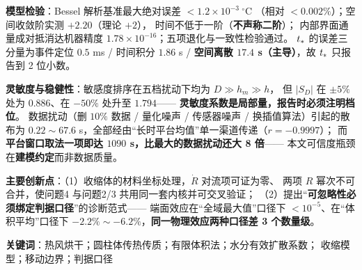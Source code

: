 \textbf{模型检验}：Bessel 解析基准最大绝对误差 $<1.2\times10^{-3}\ ^\circ\mathrm{C}$
（相对 $<0.002\%$）；空间收敛阶实测 $+2.20$（理论 $+2$），
时间不低于一阶（\textbf{不声称二阶}）；
内部界面通量成对抵消达机器精度 $1.78\times10^{-16}$；五项退化与一致性检验通过。
$t_{*}$ 的误差三分量为事件定位 $0.5$ ms / 时间积分 $1.86$ s /
\textbf{空间离散 $17.4$ s（主导）}，故 $t_{*}$ 只报告到 2 位小数。

\textbf{灵敏度与稳健性}：敏感度排序在五档扰动下均为 $D\gg h_m\gg h$，
但 $|S_D|$ 在 $\pm5\%$ 处为 $0.886$、在 $-50\%$ 处升至 $1.794$——
\textbf{灵敏度系数是局部量，报告时必须注明档位}。
数据扰动（删 $10\%$ 数据 / 量化噪声 / 传感器噪声 / 换插值算法）引起的散布为
$0.22\sim67.6$ s，全部经由``长时平台均值''单一渠道传递（$r=-0.9997$）；
而\textbf{平台窗口取法一项即达 $1090$ s，比最大的数据扰动还大 8 倍}——
本文可信度瓶颈在\textbf{建模约定}而非数据质量。

\textbf{主要创新点}：（1）收缩体的材料坐标处理，$\dot R$ 对流项可证为零、
两项 $R$ 幂次不可合并，使问题4 与问题2/3 共用同一套内核并可交叉验证；
（2）提出``\textbf{可忽略性必须绑定判据口径}''的诊断范式——
端面效应在``全域最大值''口径下 $<10^{-5}$、在``体积平均''口径下
$-2.2\%\sim-6.2\%$，\textbf{同一物理效应两种口径差 3 个数量级}。

\vspace{4pt}
\noindent\textbf{关键词}：热风烘干；圆柱体传热传质；有限体积法；水分有效扩散系数；
收缩模型；移动边界；判据口径

